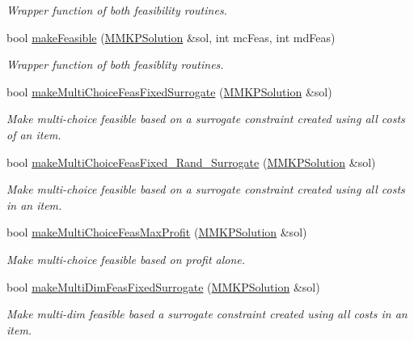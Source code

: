 \begin{DoxyCompactItemize}
\begin{DoxyCompactList}\small\item\em Wrapper function of both feasibility routines. \end{DoxyCompactList}\item 
bool \hyperlink{class_m_m_k_p___meta_heuristic_a1e212fa49412eea9d7c92a060c507f1e}{make\+Feasible} (\hyperlink{class_m_m_k_p_solution}{M\+M\+K\+P\+Solution} \&sol, int mc\+Feas, int md\+Feas)
\begin{DoxyCompactList}\small\item\em Wrapper function of both feasiblity routines. \end{DoxyCompactList}\item 
bool \hyperlink{class_m_m_k_p___meta_heuristic_aecab1f3c3f99ec38b8a7d17eddc3a2fa}{make\+Multi\+Choice\+Feas\+Fixed\+Surrogate} (\hyperlink{class_m_m_k_p_solution}{M\+M\+K\+P\+Solution} \&sol)
\begin{DoxyCompactList}\small\item\em Make multi-\/choice feasible based on a surrogate constraint created using all costs of an item. \end{DoxyCompactList}\item 
bool \hyperlink{class_m_m_k_p___meta_heuristic_ac6f2cfca54b049ca235e236df4c13000}{make\+Multi\+Choice\+Feas\+Fixed\+\_\+\+Rand\+\_\+\+Surrogate} (\hyperlink{class_m_m_k_p_solution}{M\+M\+K\+P\+Solution} \&sol)
\begin{DoxyCompactList}\small\item\em Make multi-\/choice feasible based on a surrogate constraint created using all costs in an item. \end{DoxyCompactList}\item 
bool \hyperlink{class_m_m_k_p___meta_heuristic_a420fe35418f1556624cf7fde56268cd5}{make\+Multi\+Choice\+Feas\+Max\+Profit} (\hyperlink{class_m_m_k_p_solution}{M\+M\+K\+P\+Solution} \&sol)
\begin{DoxyCompactList}\small\item\em Make multi-\/choice feasible based on profit alone. \end{DoxyCompactList}\item 
bool \hyperlink{class_m_m_k_p___meta_heuristic_aa98a53046010f99385c3592181398668}{make\+Multi\+Dim\+Feas\+Fixed\+Surrogate} (\hyperlink{class_m_m_k_p_solution}{M\+M\+K\+P\+Solution} \&sol)
\begin{DoxyCompactList}\small\item\em Make multi-\/dim feasible based a surrogate constraint created using all costs in an item. \end{DoxyCompactList}\item 

\end{DoxyCompactItemize}
